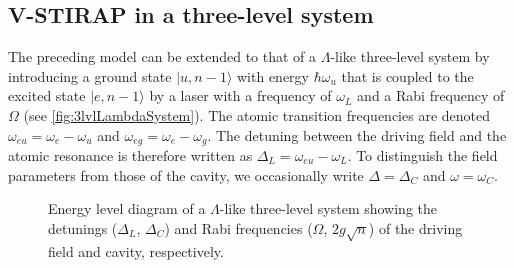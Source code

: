 \documentclass[../Thesis-IJspeert.tex]{subfiles}
\begin{document}
\subsection{V-STIRAP in a three-level system}
\label{vstirap}
The preceding model can be extended to that of a $\Lambda$-like three-level system by introducing a ground state $\vert u, n-1 \rangle$ with energy $\hbar \omega_u$ that is coupled to the excited state $\vert e, n-1 \rangle $ by a laser with a frequency of $\omega_L$ and a Rabi frequency of $\Omega$ (see \autoref{fig:3lvlLambdaSystem}). The atomic transition frequencies are denoted $\omega_{eu}=\omega_e-\omega_u$ and $\omega_{eg}=\omega_e-\omega_g$. The detuning between the driving field and the atomic resonance is therefore written as $\Delta_L=\omega_{eu}-\omega_L$. To distinguish the field parameters from those of the cavity, we occasionally write $\Delta=\Delta_C$ and $\omega=\omega_C$.
\begin{figure}[t]
	\centering
	\caption[Energy level diagram of a $\Lambda$-like three-level system]{Energy level diagram of a $\Lambda$-like three-level system showing the detunings ($\Delta_L$, $\Delta_C$) and Rabi frequencies ($\Omega$, $2g\sqrt{n}$) of the driving field and cavity, respectively.}
	\label{fig:3lvlLambdaSystem}
\end{figure}
\end{document}
